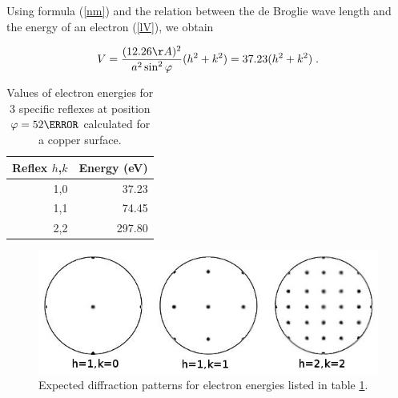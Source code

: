 \documentclass[a4paper]{scrartcl}
\numberwithin{equation}{section}
\numberwithin{figure}{section}
\numberwithin{table}{section}
\newcommand{\eq}[2]{\begin{equation}#1\label{#2}\end{equation}}
\newcommand{\Formel}[1]{(\ref{#1})}
\begin{document}
Using formula \Formel{nm} and the relation between the de Broglie wave length and the energy of an electron \Formel{lV}, we obtain

\eq{ V =\frac{(12.26 \AA)^2}{a^2 \sin^2 \varphi} (h^2+k^2) = 37.23 (h^2 +k^2) \; .}{}
\FloatBarrier
\begin{table}[!h]
\centering
\begin{tabular}{rr}
\toprule
Reflex $h$,$k$ & Energy (eV) \\
\midrule
1,0 & 37.23 \\
1,1 & 74.45 \\
2,2 & 297.80 \\
 \bottomrule
\end{tabular}
\caption{\small Values of electron energies for 3 specific reflexes at position $\varphi =52\degree$ calculated for a copper surface. }
\label{kll}
\end{table}

\begin{figure}
  \centering
   	\includegraphics[width=0.7\linewidth]{pic/52.jpeg}

 \caption{\small Expected diffraction patterns for electron energies listed in table \ref{kll}.}
        \label{fig:bragg}
\end{figure}
\FloatBarrier
\end{document}
